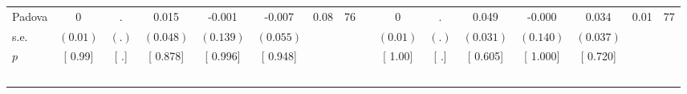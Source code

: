 \begin{longtable}{L{8em} c c c c c c c p{1em} c c c c c c c}
\quad \quad \quad Padova& 0 &         . &     0.015 &    -0.001 &    -0.007 &      0.08 &        76 & & 0 &         . &     0.049 &    -0.000 &     0.034 &      0.01 &        77  \\*
\quad \quad \quad \quad s.e.& $ (     0.01)$ & $ (        .)$ & $ (    0.048)$ & $ (    0.139)$ & $ (    0.055)$ & & & & $ (     0.01)$ & $ (        .)$ & $ (    0.031)$ & $ (    0.140)$ & $ (    0.037)$ & &  \\*
\quad \quad \quad \quad $ p$ & [     0.99] & [        .] & [    0.878] & [    0.996] & [    0.948] & & & & [     1.00] & [        .] & [    0.605] & [    1.000] & [    0.720] & &  \\[1em]
~\\[1em]
\end{longtable}